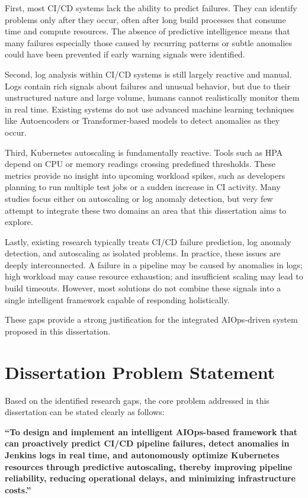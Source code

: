 \documentclass[12pt]{report}
\begin{document}
First, most CI/CD systems lack the ability to predict failures. They can identify problems only after they occur, often after long build processes that consume time and compute resources. The absence of predictive intelligence means that many failures especially those caused by recurring patterns or subtle anomalies could have been prevented if early warning signals were identified.

Second, log analysis within CI/CD systems is still largely reactive and manual. Logs contain rich signals about failures and unusual behavior, but due to their unstructured nature and large volume, humans cannot realistically monitor them in real time. Existing systems do not use advanced machine learning techniques like Autoencoders or Transformer-based models to detect anomalies as they occur.

Third, Kubernetes autoscaling is fundamentally reactive. Tools such as HPA depend on CPU or memory readings crossing predefined thresholds. These metrics provide no insight into upcoming workload spikes, such as developers planning to run multiple test jobs or a sudden increase in CI activity. Many studies focus either on autoscaling or log anomaly detection, but very few attempt to integrate these two domains an area that this dissertation aims to explore.

Lastly, existing research typically treats CI/CD failure prediction, log anomaly detection, and autoscaling as isolated problems. In practice, these issues are deeply interconnected. A failure in a pipeline may be caused by anomalies in logs; high workload may cause resource exhaustion; and insufficient scaling may lead to build timeouts. However, most solutions do not combine these signals into a single intelligent framework capable of responding holistically.

These gaps provide a strong justification for the integrated AIOps-driven system proposed in this dissertation.

\section{Dissertation Problem Statement}

Based on the identified research gaps, the core problem addressed in this dissertation can be stated clearly as follows:

\textbf{“To design and implement an intelligent AIOps-based framework that can proactively predict CI/CD pipeline failures, detect anomalies in Jenkins logs in real time, and autonomously optimize Kubernetes resources through predictive autoscaling, thereby improving pipeline reliability, reducing operational delays, and minimizing infrastructure costs.”}
\end{document}
